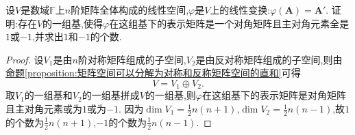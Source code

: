 \documentclass[../../main.tex]{subfiles}%
\begin{document}
\begin{example}
设\(V\)是数域\(\mathbb{F}\)上\(n\)阶矩阵全体构成的线性空间,\(\varphi\)是\(V\)上的线性变换:\(\varphi(\boldsymbol{A})=\boldsymbol{A}'\). 证明:存在\(V\)的一组基,使得\(\varphi\)在这组基下的表示矩阵是一个对角矩阵且主对角元素全是\(1\)或\(-1\),并求出\(1\)和\(-1\)的个数.
\end{example}
\begin{proof}
设\(V_1\)是由\(n\)阶对称矩阵组成的子空间,\(V_2\)是由反对称矩阵组成的子空间,则由\hyperref[proposition:矩阵空间可以分解为对称和反称矩阵空间的直和]{命题\ref{proposition:矩阵空间可以分解为对称和反称矩阵空间的直和}}可得
\[
V = V_1\oplus V_2.
\]
取\(V_1\)的一组基和\(V_2\)的一组基拼成\(V\)的一组基,则\(\varphi\)在这组基下的表示矩阵是对角矩阵且主对角元素或为\(1\)或为\(-1\). 因为\(\dim V_1=\frac{1}{2}n(n + 1)\),\(\dim V_2=\frac{1}{2}n(n - 1)\),故\(1\)的个数为\(\frac{1}{2}n(n + 1)\),\(-1\)的个数为\(\frac{1}{2}n(n - 1)\).
\end{proof}
\end{document}
